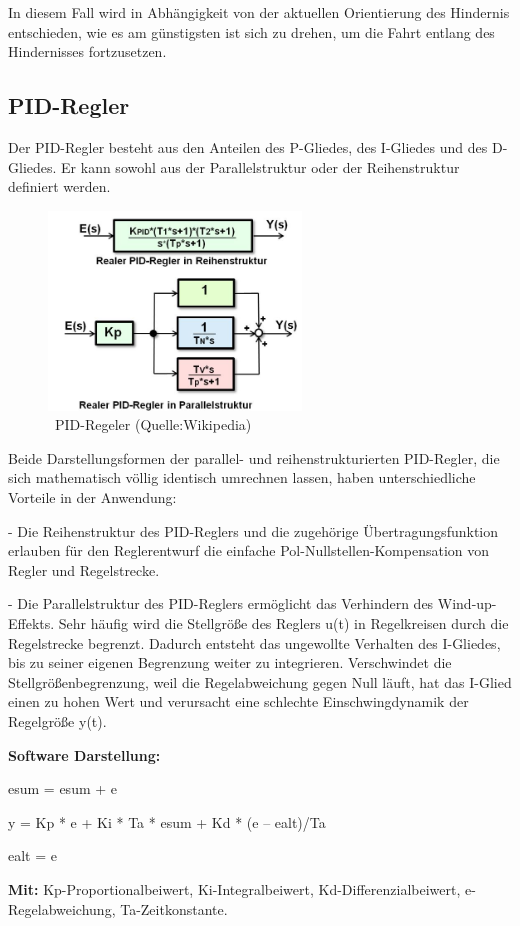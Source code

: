  In diesem Fall wird in Abhängigkeit von der aktuellen Orientierung des Hindernis entschieden, wie es am günstigsten ist sich zu drehen, um die Fahrt entlang des Hindernisses fortzusetzen.



\subsection{PID-Regler}

Der PID-Regler besteht aus den Anteilen des P-Gliedes, des I-Gliedes und des D-Gliedes. Er kann sowohl aus der Parallelstruktur oder der Reihenstruktur definiert werden.

\begin{figure}[!h]  %
	\centering\includegraphics[width=0.6\textwidth]{images/PID.jpg}
	\caption{ \ PID-Regeler (Quelle:Wikipedia)}
	\label{pid} %
\end{figure}

Beide Darstellungsformen der parallel- und reihenstrukturierten PID-Regler, die sich mathematisch völlig identisch umrechnen lassen, haben unterschiedliche Vorteile in der Anwendung:

- Die Reihenstruktur des PID-Reglers und die zugehörige Übertragungsfunktion erlauben für den Reglerentwurf die einfache Pol-Nullstellen-Kompensation von Regler und Regelstrecke.
 
- Die Parallelstruktur des PID-Reglers ermöglicht das Verhindern des Wind-up-Effekts. Sehr häufig wird die Stellgröße des Reglers u(t) in Regelkreisen durch die Regelstrecke begrenzt. Dadurch entsteht das ungewollte Verhalten des I-Gliedes, bis zu seiner eigenen Begrenzung weiter zu integrieren. Verschwindet die Stellgrößenbegrenzung, weil die Regelabweichung gegen Null läuft, hat das I-Glied einen zu hohen Wert und verursacht eine schlechte Einschwingdynamik der Regelgröße y(t). 

\textbf{Software Darstellung:} 

esum = esum + e

y = Kp * e + Ki * Ta * esum + Kd * (e – ealt)/Ta

ealt = e

\textbf{Mit:}  Kp-Proportionalbeiwert, Ki-Integralbeiwert, Kd-Differenzialbeiwert, e-Regelabweichung, Ta-Zeitkonstante.

\pagebreak
